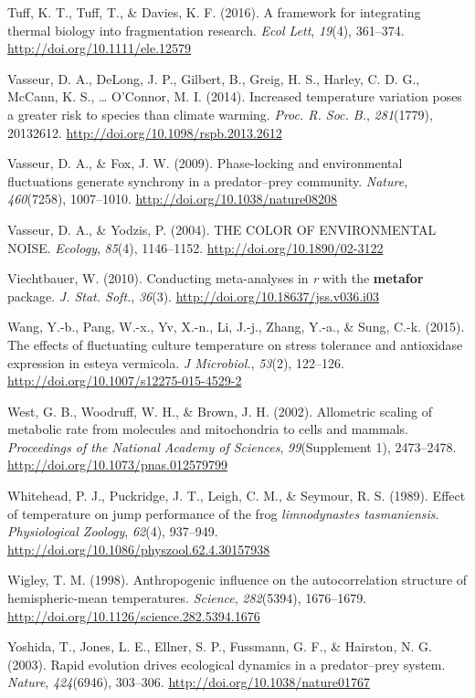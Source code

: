 \documentclass[12pt,twoside]{reedthesis}
\begin{document}
\leavevmode\hypertarget{ref-tuff_framework_2016}{}%
Tuff, K. T., Tuff, T., \& Davies, K. F. (2016). A framework for integrating thermal biology into fragmentation research. \emph{Ecol Lett}, \emph{19}(4), 361--374. \url{http://doi.org/10.1111/ele.12579}

\leavevmode\hypertarget{ref-vasseur_increased_2014}{}%
Vasseur, D. A., DeLong, J. P., Gilbert, B., Greig, H. S., Harley, C. D. G., McCann, K. S., \ldots{} O'Connor, M. I. (2014). Increased temperature variation poses a greater risk to species than climate warming. \emph{Proc. R. Soc. B.}, \emph{281}(1779), 20132612. \url{http://doi.org/10.1098/rspb.2013.2612}

\leavevmode\hypertarget{ref-vasseur_phase-locking_2009}{}%
Vasseur, D. A., \& Fox, J. W. (2009). Phase-locking and environmental fluctuations generate synchrony in a predator--prey community. \emph{Nature}, \emph{460}(7258), 1007--1010. \url{http://doi.org/10.1038/nature08208}

\leavevmode\hypertarget{ref-vasseur_color_2004}{}%
Vasseur, D. A., \& Yodzis, P. (2004). THE COLOR OF ENVIRONMENTAL NOISE. \emph{Ecology}, \emph{85}(4), 1146--1152. \url{http://doi.org/10.1890/02-3122}

\leavevmode\hypertarget{ref-viechtbauer_conducting_2010}{}%
Viechtbauer, W. (2010). Conducting meta-analyses in \emph{r} with the \textbf{metafor} package. \emph{J. Stat. Soft.}, \emph{36}(3). \url{http://doi.org/10.18637/jss.v036.i03}

\leavevmode\hypertarget{ref-wang_effects_2015}{}%
Wang, Y.-b., Pang, W.-x., Yv, X.-n., Li, J.-j., Zhang, Y.-a., \& Sung, C.-k. (2015). The effects of fluctuating culture temperature on stress tolerance and antioxidase expression in esteya vermicola. \emph{J Microbiol.}, \emph{53}(2), 122--126. \url{http://doi.org/10.1007/s12275-015-4529-2}

\leavevmode\hypertarget{ref-west_allometric_2002}{}%
West, G. B., Woodruff, W. H., \& Brown, J. H. (2002). Allometric scaling of metabolic rate from molecules and mitochondria to cells and mammals. \emph{Proceedings of the National Academy of Sciences}, \emph{99}(Supplement 1), 2473--2478. \url{http://doi.org/10.1073/pnas.012579799}

\leavevmode\hypertarget{ref-whitehead_effect_1989}{}%
Whitehead, P. J., Puckridge, J. T., Leigh, C. M., \& Seymour, R. S. (1989). Effect of temperature on jump performance of the frog \emph{limnodynastes tasmaniensis}. \emph{Physiological Zoology}, \emph{62}(4), 937--949. \url{http://doi.org/10.1086/physzool.62.4.30157938}

\leavevmode\hypertarget{ref-wigley_anthropogenic_1998-1}{}%
Wigley, T. M. (1998). Anthropogenic influence on the autocorrelation structure of hemispheric-mean temperatures. \emph{Science}, \emph{282}(5394), 1676--1679. \url{http://doi.org/10.1126/science.282.5394.1676}

\leavevmode\hypertarget{ref-yoshida_rapid_2003}{}%
Yoshida, T., Jones, L. E., Ellner, S. P., Fussmann, G. F., \& Hairston, N. G. (2003). Rapid evolution drives ecological dynamics in a predator--prey system. \emph{Nature}, \emph{424}(6946), 303--306. \url{http://doi.org/10.1038/nature01767}


\end{document}
